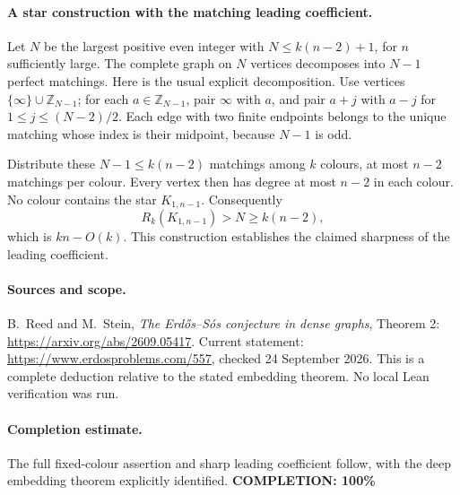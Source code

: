 \paragraph{A star construction with the matching leading coefficient.}
Let \(N\) be the largest positive even integer with
\(N\leq k(n-2)+1\), for \(n\) sufficiently large.
The complete graph on \(N\) vertices decomposes into \(N-1\)
perfect matchings. Here is the usual explicit decomposition.
Use vertices \(\{\infty\}\cup\mathbb Z_{N-1}\); for each
\(a\in\mathbb Z_{N-1}\), pair \(\infty\) with \(a\), and pair
\(a+j\) with \(a-j\) for \(1\leq j\leq(N-2)/2\).
Each edge with two finite endpoints belongs to the unique matching
whose index is their midpoint, because \(N-1\) is odd.

Distribute these \(N-1\leq k(n-2)\) matchings among \(k\) colours,
at most \(n-2\) matchings per colour. Every vertex then has degree
at most \(n-2\) in each colour. No colour contains the star
\(K_{1,n-1}\). Consequently
\[
 R_k(K_{1,n-1})>N\geq k(n-2),
\]
which is \(kn-O(k)\). This construction establishes the claimed
sharpness of the leading coefficient.

\paragraph{Sources and scope.}
B.~Reed and M.~Stein, \emph{The Erd\H{o}s--S\'os conjecture in
dense graphs}, Theorem 2:
\url{https://arxiv.org/abs/2609.05417}.
Current statement: \url{https://www.erdosproblems.com/557},
checked 24 September 2026. This is a complete deduction relative to
the stated embedding theorem. No local Lean verification was run.

\paragraph{Completion estimate.}
The full fixed-colour assertion and sharp leading coefficient follow,
with the deep embedding theorem explicitly identified.
\textbf{COMPLETION: 100\%}
